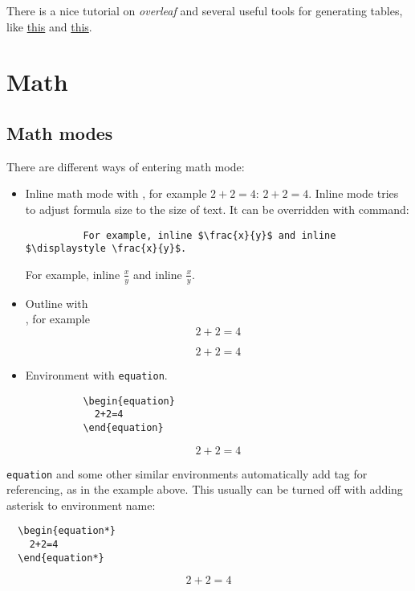 There is a nice tutorial on \emph{overleaf} \autocite{Overleaf-tables-2018} and several useful tools for generating tables, like \href{https://www.tablesgenerator.com/latex_tables}{this} and \href{https://www.latex-tables.com/}{this}.

\section{Math}
\subsection{Math modes}
There are different ways of entering math mode:
\begin{itemize}
  \item Inline math mode with \texttt{$$}, for example \texttt{$2+2=4$}: $2+2=4$. %
        Inline mode tries to adjust formula size to the size of text.
        It can be overridden with \texttt{\displaystyle} command:
        \begin{verbatim}
          For example, inline $\frac{x}{y}$ and inline $\displaystyle \frac{x}{y}$.
        \end{verbatim}
        \begin{mdframed}[style=example]
          For example, inline $\frac{x}{y}$ and inline $\displaystyle \frac{x}{y}$.
        \end{mdframed}
  \item Outline with \texttt{\[\]}, for example \texttt{\[2+2=4\]}
        \begin{mdframed}[style=example]
          \[2+2=4\]
        \end{mdframed}
  \item Environment with \texttt{equation}.
        \begin{verbatim}
          \begin{equation}
            2+2=4
          \end{equation}
        \end{verbatim}
        \begin{mdframed}[style=example]
          \begin{equation}
            2+2=4
          \end{equation}
        \end{mdframed}
\end{itemize}

\texttt{equation} and some other similar environments automatically add tag for referencing, as in the example above.
This usually can be turned off with adding asterisk to environment name:
\begin{verbatim}
  \begin{equation*}
    2+2=4
  \end{equation*}
\end{verbatim}
\begin{mdframed}[style=example]
  \begin{equation*}
    2+2=4
  \end{equation*}
\end{mdframed}

